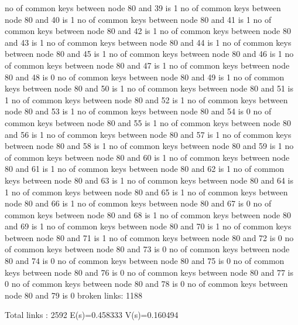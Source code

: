 no of common keys between node 80 and 39 is 1
no of common keys between node 80 and 40 is 1
no of common keys between node 80 and 41 is 1
no of common keys between node 80 and 42 is 1
no of common keys between node 80 and 43 is 1
no of common keys between node 80 and 44 is 1
no of common keys between node 80 and 45 is 1
no of common keys between node 80 and 46 is 1
no of common keys between node 80 and 47 is 1
no of common keys between node 80 and 48 is 0
no of common keys between node 80 and 49 is 1
no of common keys between node 80 and 50 is 1
no of common keys between node 80 and 51 is 1
no of common keys between node 80 and 52 is 1
no of common keys between node 80 and 53 is 1
no of common keys between node 80 and 54 is 0
no of common keys between node 80 and 55 is 1
no of common keys between node 80 and 56 is 1
no of common keys between node 80 and 57 is 1
no of common keys between node 80 and 58 is 1
no of common keys between node 80 and 59 is 1
no of common keys between node 80 and 60 is 1
no of common keys between node 80 and 61 is 1
no of common keys between node 80 and 62 is 1
no of common keys between node 80 and 63 is 1
no of common keys between node 80 and 64 is 1
no of common keys between node 80 and 65 is 1
no of common keys between node 80 and 66 is 1
no of common keys between node 80 and 67 is 0
no of common keys between node 80 and 68 is 1
no of common keys between node 80 and 69 is 1
no of common keys between node 80 and 70 is 1
no of common keys between node 80 and 71 is 1
no of common keys between node 80 and 72 is 0
no of common keys between node 80 and 73 is 0
no of common keys between node 80 and 74 is 0
no of common keys between node 80 and 75 is 0
no of common keys between node 80 and 76 is 0
no of common keys between node 80 and 77 is 0
no of common keys between node 80 and 78 is 0
no of common keys between node 80 and 79 is 0
broken links: 1188

Total links : 2592
E(s)=0.458333
V(s)=0.160494

